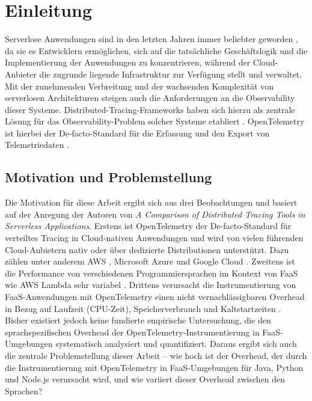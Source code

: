 \chapter{Einleitung}
\label{ch:chapter01}
Serverlose Anwendungen sind in den letzten Jahren immer beliebter geworden \cite{MarketsandMarkets2025ServerlessComputing}, da sie es Entwicklern ermöglichen,
sich auf die tatsächliche Geschäftslogik und die Implementierung der Anwendungen zu konzentrieren, während der 
Cloud-Anbieter die zugrunde liegende Infrastruktur zur Verfügung stellt und verwaltet. Mit der zunehmenden Verbreitung
und der wachsenden Komplexität von serverlosen Architekturen steigen auch die Anforderungen an die Observability dieser
Systeme. Distributed-Tracing-Frameworks haben sich hierzu als zentrale Lösung für das Observability-Problem 
solcher Systeme etabliert \cite{majors2026observability}. OpenTelemetry ist hierbei der De-facto-Standard für die Erfassung und den Export von 
Telemetriedaten \cite{AWSLambdaBestPractices}.

%
%
\section{Motivation und Problemstellung}
\label{sec:intro:motivation}
Die Motivation für diese Arbeit ergibt sich aus drei Beobachtungen und basiert auf der Anregung der Autoren von 
\emph{\glqq A Comparison of Distributed Tracing Tools in Serverless Applications\grqq}\cite{10254754}. 
Erstens ist OpenTelemetry der De-facto-Standard für verteiltes Tracing in Cloud-nativen Anwendungen \cite{AWSLambdaBestPractices} und wird von 
vielen führenden Cloud-Anbietern nativ oder über dedizierte Distributionen unterstützt. Dazu zählen unter anderem 
\ac{AWS} \cite{AWSDistributedTracing}, Microsoft Azure \cite{AzureOpenTelemetry} und Google Cloud \cite{GoogleCloudOpenTelemetry}. Zweitens ist die Performance von 
verschiedenen Programmiersprachen im Kontext von \ac{FaaS} wie \ac{AWS} Lambda 
sehr variabel \cite{Rodriguez2024Evaluation}. Drittens verursacht die Instrumentierung von FaaS-Anwendungen mit OpenTelemetry einen nicht 
vernachlässigbaren Overhead in Bezug auf Laufzeit (CPU-Zeit), Speicherverbrauch und Kaltstartzeiten \cite{10254754}.
\\
Bisher existiert jedoch keine fundierte empirische Untersuchung, die den sprachspezifischen Overhead der 
OpenTelemetry-Instrumentierung in \ac{FaaS}-Umgebungen systematisch analysiert und quantifiziert. Daraus ergibt sich auch 
die zentrale Problemstellung dieser Arbeit – wie hoch ist der Overhead, der durch die Instrumentierung mit OpenTelemetry
in \ac{FaaS}-Umgebungen für Java, Python und Node.js verursacht wird, und wie variiert dieser Overhead zwischen den Sprachen?


